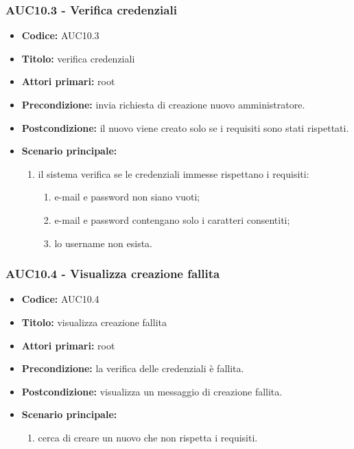 \documentclass[casi-duso]{subfiles}
\begin{document}
\subsubsection{AUC10.3 - Verifica credenziali}
\label{subsub:AUC10.3}
\begin{itemize}
  \item \textbf{Codice:} AUC10.3
  \item \textbf{Titolo:} verifica credenziali
  \item \textbf{Attori primari:} root
  \item \textbf{Precondizione:}  invia richiesta di creazione nuovo amministratore.
  \item \textbf{Postcondizione:} il nuovo  viene creato solo se i requisiti sono stati rispettati.
  \item \textbf{Scenario principale:} 
  \begin{enumerate}
    \item il sistema verifica se le credenziali immesse rispettano i requisiti:
    \begin{enumerate}
      \item e-mail e password non siano vuoti;
      \item e-mail e password contengano solo i caratteri consentiti;
      \item lo username non esista.
    \end{enumerate}
  \end{enumerate}
\end{itemize}

\subsubsection{AUC10.4 - Visualizza creazione fallita}
\label{subsub:AUC10.4}
\begin{itemize}
  \item \textbf{Codice:} AUC10.4
  \item \textbf{Titolo:} visualizza creazione fallita
  \item \textbf{Attori primari:} root
  \item \textbf{Precondizione:} la verifica delle credenziali è fallita.
  \item \textbf{Postcondizione:}  visualizza un messaggio di creazione fallita.
  \item \textbf{Scenario principale:} 
  \begin{enumerate}
    \item {} cerca di creare un nuovo  che non rispetta i requisiti.
  \end{enumerate}
\end{itemize}
\end{document}
